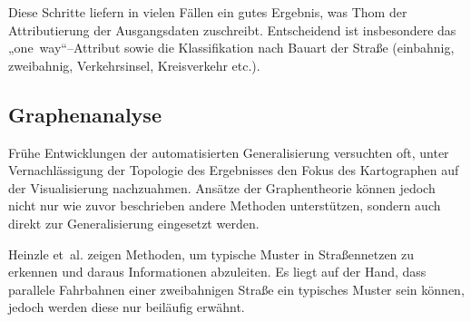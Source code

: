 \documentclass[../main/thesis.tex]{subfiles}
\begin{document}
Diese Schritte liefern in vielen Fällen ein gutes Ergebnis, was Thom der Attributierung der Ausgangsdaten zuschreibt.
Entscheidend ist insbesondere das „one~way“–Attribut sowie die Klassifikation nach Bauart der Straße (einbahnig, zweibahnig, Verkehrsinsel, Kreisverkehr etc.). 


\subsection{Graphenanalyse}



Frühe Entwicklungen der automatisierten Generalisierung versuchten oft, unter Vernachlässigung der Topologie des Ergebnisses den Fokus des Kartographen auf der Visualisierung nachzuahmen. 
Ansätze der Graphentheorie können jedoch nicht nur wie zuvor beschrieben andere Methoden unterstützen, sondern auch direkt zur Generalisierung eingesetzt werden.


Heinzle et~al. zeigen Methoden, um typische Muster in Straßennetzen zu erkennen und daraus Informationen abzuleiten. 
Es liegt auf der Hand, dass parallele Fahrbahnen einer zweibahnigen Straße ein typisches Muster sein können, jedoch werden diese nur beiläufig erwähnt. 

\end{document}

